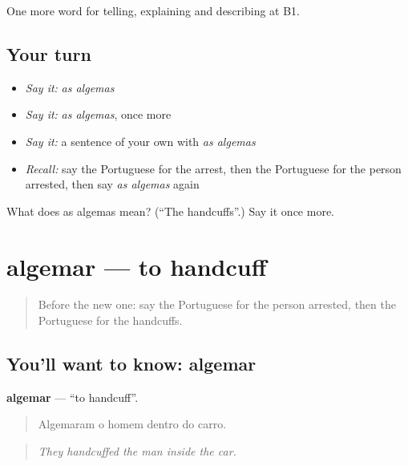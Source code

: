 \begin{grammarlens}[title={What you've built}]
One more word for telling, explaining and describing at B1.
\end{grammarlens}

\subsection*{Your turn}
\begin{itemize}
\raggedright
  \item \emph{Say it:} \emph{as algemas}
  \item \emph{Say it:} \emph{as algemas}, once more
  \item \emph{Say it:} a sentence of your own with \emph{as algemas}
  \item \emph{Recall:} say the Portuguese for the arrest, then the Portuguese for the person arrested, then say \emph{as algemas} again
\end{itemize}

\begin{tcolorbox}[breakable,colback=teal!4,colframe=teal!35!black,title={Before you move on}]
What does as algemas mean? (\textquotedblleft{}The handcuffs\textquotedblright{}.) Say it once more.
\end{tcolorbox}
\section[algemar]{algemar — to handcuff}

\label{lesson:PT-C296-algemar}



\begin{quote}
Before the new one: say the Portuguese for the person arrested, then the Portuguese for the handcuffs.
\end{quote}

\subsection*{You'll want to know: algemar}
\textbf{algemar} — \textquotedblleft{}to handcuff\textquotedblright{}.

\begin{quote}
Algemaram o homem dentro do carro.
\end{quote}

\begin{quote}
\emph{They handcuffed the man inside the car.}
\end{quote}

